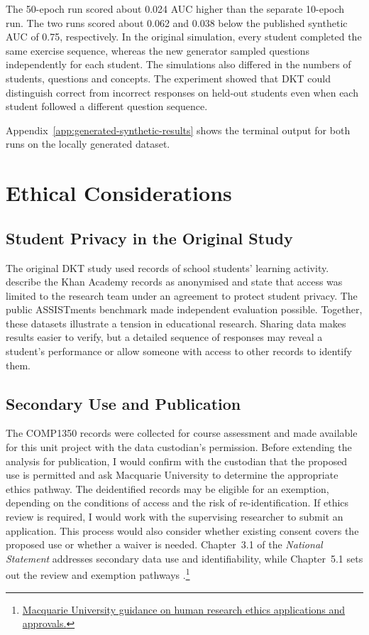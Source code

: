 \documentclass[11pt]{article}
\begin{document}
The 50-epoch run scored about 0.024 AUC higher than the separate
10-epoch run. The two runs scored about 0.062 and 0.038 below the
published synthetic AUC of 0.75, respectively. In the original
simulation, every student completed the same exercise sequence,
whereas the new generator sampled questions independently for each
student. The simulations also differed in the numbers of students,
questions and concepts. The experiment showed that DKT could distinguish correct from
incorrect responses on held-out students even when each student
followed a different question sequence.

Appendix~\ref{app:generated-synthetic-results} shows the terminal
output for both runs on the locally generated dataset.



\section{Ethical Considerations}

\subsection{Student Privacy in the Original Study}

The original DKT study used records of school students' learning
activity. \citet{piech2015deep} describe the Khan Academy records as
anonymised and state that access was limited to the research team under
an agreement to protect student privacy. The public ASSISTments
benchmark made independent evaluation possible. Together, these
datasets illustrate a tension in educational research. Sharing data
makes results easier to verify, but a detailed sequence of responses
may reveal a student's performance or allow someone with access to
other records to identify them.

\subsection{Secondary Use and Publication}

The COMP1350 records were collected for course assessment and made
available for this unit project with the data custodian's permission.
Before extending the analysis for publication, I would confirm with
the custodian that the proposed use is permitted and ask Macquarie
University to determine the appropriate ethics pathway. The
deidentified records may be eligible for an exemption, depending on
the conditions of access and the risk of re-identification. If ethics
review is required, I would work with the supervising researcher to
submit an application. This process would also consider whether
existing consent covers the proposed use or whether a waiver is
needed. Chapter~3.1 of the \textit{National Statement} addresses
secondary data use and identifiability, while Chapter~5.1 sets out
the review and exemption pathways
\citep{nhmrc2025nationalstatement}.\footnote{\href{https://www.mq.edu.au/research/our-research/research-ethics-and-integrity/human-ethics/applications-and-approvals}{Macquarie University guidance on human research ethics applications and approvals.}}
\end{document}
